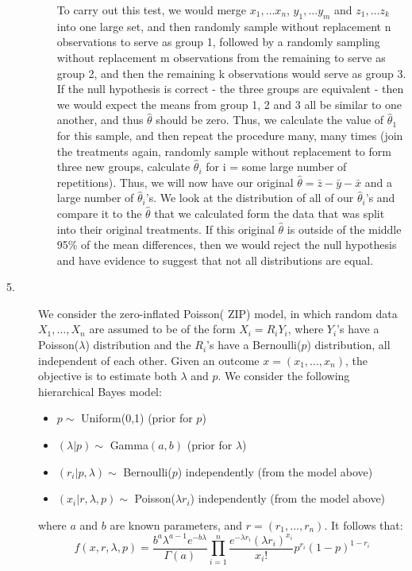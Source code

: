 \documentclass[12pt]{article}
\begin{document}
\begin{description}
\begin{itemize}
To carry out this test, we would merge $x_1, \dots x_n$, $y_1, \dots y_m$ and $z_1, \dots z_k$ into one large set, and then randomly sample without replacement n observations to serve as group 1, followed by a randomly sampling without replacement  m observations from the remaining to serve as group 2, and then the remaining k observations would serve as group 3. If the null hypothesis is correct - the three groups are equivalent - then we would expect the means from group 1, 2 and 3 all be similar to one another, and thus $\hat{\theta}$ should be zero. Thus, we calculate the value of $\hat{\theta}_1$ for this sample, and then repeat the procedure many, many times (join the treatments again, randomly sample without replacement to form three new groups, calculate $\hat{\theta}_i$ for i = some large number of repetitions). Thus, we will now have our original $\hat{\theta} = \bar{z} - \bar{y} - \bar{x}$ and a large number of $\hat{\theta}_i$'s. We look at the distribution of all of our $\hat{\theta}_i$'s and compare it to the $\hat{\theta}$ that we calculated form the data that was split into their original treatments. If this original $\hat{\theta}$ is outside of the middle 95\% of the mean differences, then we would reject the null hypothesis and have evidence to suggest that not all distributions are equal.
\end{itemize}



\item[5.] We consider the zero-inflated Poisson( ZIP) model, in which random data $X_1, \dots, X_n$ are assumed to be of the form $X_i = R_iY_i$, where $Y_i$'s have a Poisson($\lambda$) distribution and the $R_i$'s have a Bernoulli($p$) distribution, all independent of each other. Given an outcome $x = (x_1, \dots, x_n)$, the objective is to estimate both $\lambda$ and $p$. We consider the following hierarchical Bayes model:
\begin{itemize}
\item $p \sim$ Uniform(0,1) (prior for $p$)
\item $(\lambda | p) \sim$ Gamma$(a, b)$ (prior for $\lambda$)
\item $(r_i | p, \lambda) \sim$ Bernoulli($p$) independently (from the model above)
\item $(x_i | r, \lambda, p) \sim$ Poisson($\lambda r_i$) independently (from the model above)
\end{itemize}
where $a$ and $b$ are known parameters, and $r = (r_1, \dots, r_n)$. It follows that:
\[f(x, r, \lambda, p) = \frac{b^a\lambda^{a-1}e^{-b\lambda}}{\Gamma(a)}\prod^n_{i = 1} \frac{e^{-\lambda r_i} (\lambda r_i)^{x_i}}{x_i!} p^{r_i} (1 - p)^{1 - r_i}\]


\end{description}
\end{document}
